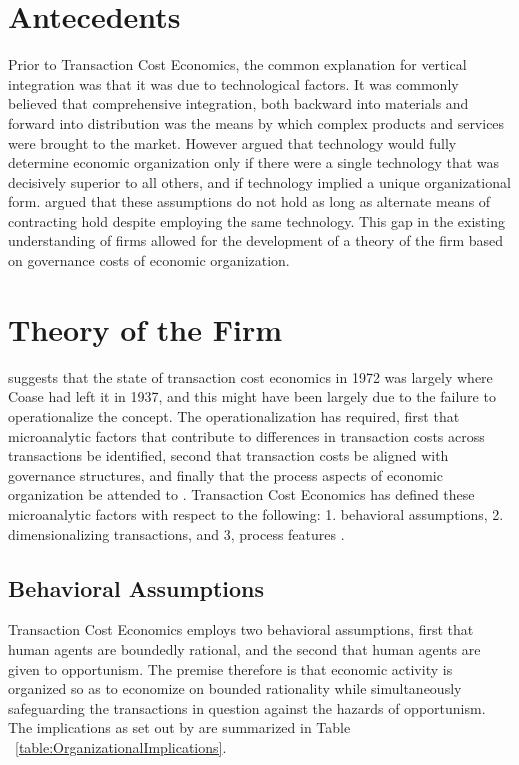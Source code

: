 \documentclass[12pt]{article}
\begin{document}
\section{Antecedents}
Prior to Transaction Cost Economics, the common explanation for vertical integration was that it was due to technological factors.  It was commonly believed that comprehensive integration, both backward into materials and forward into distribution was the means by which complex products and services were brought to the market. However \cite{Williamson1985} argued that technology would fully determine economic organization only if there were a single technology that was decisively superior to all others, and if technology implied a unique organizational form.  \cite{Williamson1985} argued that these assumptions do not hold as long as alternate means of contracting hold despite employing the same technology. This gap in the existing understanding of firms allowed for the development of a theory of the firm based on governance costs of economic organization.

\section{Theory of the Firm}
\cite{Williamson1988} suggests that the state of transaction cost economics in 1972 was largely where Coase had left it in 1937, and this might have been largely due to the failure to operationalize the concept. The operationalization has required, first that microanalytic factors that contribute to differences in transaction costs across transactions be identified, second that transaction costs be aligned with governance structures, and finally that the process aspects of economic organization be attended to \citep{Williamson1988}. Transaction Cost Economics has defined these microanalytic factors with respect to the following: 1. behavioral assumptions, 2. dimensionalizing transactions, and 3, process features \citep{Williamson1988}.

\subsection{Behavioral Assumptions}
Transaction Cost Economics employs two behavioral assumptions, first that human agents are boundedly rational, and the second that human agents are given to opportunism. The premise therefore is that economic activity  is organized so as to economize on bounded rationality while simultaneously  safeguarding the transactions in question against the hazards of opportunism. The implications as set out by \cite{Williamson1988} are summarized in Table ~\ref{table:OrganizationalImplications}.
\end{document}
